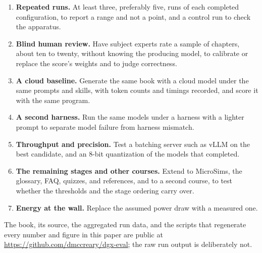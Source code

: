 \begin{enumerate}
\item \textbf{Repeated runs.} At least three, preferably five, runs of each completed configuration, to report a range and not a point, and a control run to check the apparatus.
\item \textbf{Blind human review.} Have subject experts rate a sample of chapters, about ten to twenty, without knowing the producing model, to calibrate or replace the score's weights and to judge correctness.
\item \textbf{A cloud baseline.} Generate the same book with a cloud model under the same prompts and skills, with token counts and timings recorded, and score it with the same program.
\item \textbf{A second harness.} Run the same models under a harness with a lighter prompt to separate model failure from harness mismatch.
\item \textbf{Throughput and precision.} Test a batching server such as vLLM on the best candidate, and an 8-bit quantization of the models that completed.
\item \textbf{The remaining stages and other courses.} Extend to MicroSims, the glossary, FAQ, quizzes, and references, and to a second course, to test whether the thresholds and the stage ordering carry over.
\item \textbf{Energy at the wall.} Replace the assumed power draw with a measured one.
\end{enumerate}

\noindent The book, its source, the aggregated run data, and the scripts that regenerate every number and figure in this paper are public at \url{https://github.com/dmccreary/dgx-eval}; the raw run output is deliberately not.

